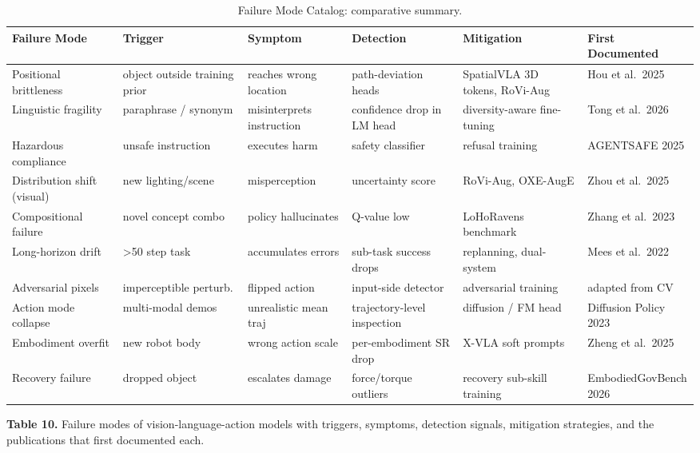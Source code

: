 \documentclass{article}
\begin{document}
\begin{table}[t]
\centering
\caption{Failure Mode Catalog: comparative summary.}
\label{tab:failure-mode-catalog}
\begin{tabular}{>{\raggedright\arraybackslash}p{0.1698\linewidth}
  >{\raggedright\arraybackslash}p{0.1824\linewidth}
  >{\raggedright\arraybackslash}p{0.1572\linewidth}
  >{\raggedright\arraybackslash}p{0.1698\linewidth}
  >{\raggedright\arraybackslash}p{0.1887\linewidth}
  >{\raggedright\arraybackslash}p{0.1321\linewidth}}
\toprule
Failure Mode & Trigger & Symptom & Detection & Mitigation & First Documented \\
\midrule
Positional brittleness & object outside training prior & reaches wrong location & path-deviation heads & SpatialVLA 3D tokens, RoVi-Aug & Hou et al.~2025 \\
Linguistic fragility & paraphrase / synonym & misinterprets instruction & confidence drop in LM head & diversity-aware fine-tuning & Tong et al.~2026 \\
Hazardous compliance & unsafe instruction & executes harm & safety classifier & refusal training & AGENTSAFE 2025 \\
Distribution shift (visual) & new lighting/scene & misperception & uncertainty score & RoVi-Aug, OXE-AugE & Zhou et al.~2025 \\
Compositional failure & novel concept combo & policy hallucinates & Q-value low & LoHoRavens benchmark & Zhang et al.~2023 \\
Long-horizon drift & \textgreater50 step task & accumulates errors & sub-task success drops & replanning, dual-system & Mees et al.~2022 \\
Adversarial pixels & imperceptible perturb. & flipped action & input-side detector & adversarial training & adapted from CV \\
Action mode collapse & multi-modal demos & unrealistic mean traj & trajectory-level inspection & diffusion / FM head & Diffusion Policy 2023 \\
Embodiment overfit & new robot body & wrong action scale & per-embodiment SR drop & X-VLA soft prompts & Zheng et al.~2025 \\
Recovery failure & dropped object & escalates damage & force/torque outliers & recovery sub-skill training & EmbodiedGovBench 2026 \\
\end{tabular}
\end{table}

\textbf{Table 10.} Failure modes of vision-language-action models with triggers, symptoms, detection signals, mitigation strategies, and the publications that first documented each.
\end{document}
